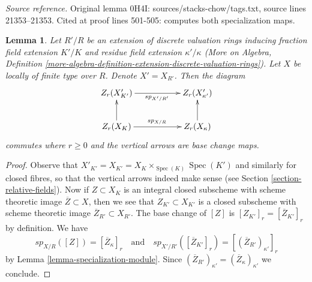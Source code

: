 \documentclass{stacks-project}
\theoremstyle{plain}
\newtheorem{lemma}[subsection]{Lemma}
\theoremstyle{definition}
\theoremstyle{remark}
\numberwithin{equation}{subsection}
\def\Spec{\mathop{\mathrm{Spec}}}
\begin{document}
\noindent\textit{Source reference.} Original lemma 0H4I: sources/stacks-chow/tags.txt, source lines 21353--21353. Cited at proof lines 501-505: computes both specialization maps.\par\medskip
\begin{lemma}
\label{lemma-specialization-extension}
Let $R'/R$ be an extension of discrete valuation rings inducing fraction field
extension $K'/K$ and residue field extension $\kappa'/\kappa$
(More on Algebra, Definition
\ref{more-algebra-definition-extension-discrete-valuation-rings}).
Let $X$ be locally of finite type over $R$. Denote $X' = X_{R'}$.
Then the diagram
$$
\xymatrix{
Z_r(X'_{K'}) \ar[rr]_{sp_{X'/R'}} & & Z_r(X'_{\kappa'}) \\
Z_r(X_K) \ar[rr]^{sp_{X/R}} \ar[u] & & Z_r(X_\kappa) \ar[u]
}
$$
commutes where $r \geq 0$ and the vertical arrows are base change maps.
\end{lemma}

\begin{proof}
Observe that $X'_{K'} = X_{K'} = X_K \times_{\Spec(K)} \Spec(K')$
and similarly for closed fibres, so that the vertical arrows indeed
make sense (see Section \ref{section-relative-fields}).
Now if $Z \subset X_K$ is an integral closed subscheme with
scheme theoretic image $\overline{Z} \subset X$, then we see that
$Z_{K'} \subset X_{K'}$ is a closed subscheme with scheme theoretic
image $\overline{Z}_{R'} \subset X_{R'}$. The base change of
$[Z]$ is $[Z_{K'}]_r = [\overline{Z}_{K'}]_r$ by definition. We have
$$
sp_{X/R}([Z]) = [\overline{Z}_\kappa]_r
\quad\text{and}\quad
sp_{X'/R'}([\overline{Z}_{K'}]_r) = [(\overline{Z}_{R'})_{\kappa'}]_r
$$
by Lemma \ref{lemma-specialization-module}. Since
$(\overline{Z}_{R'})_{\kappa'} = (\overline{Z}_\kappa)_{\kappa'}$
we conclude.
\end{proof}
\end{document}
